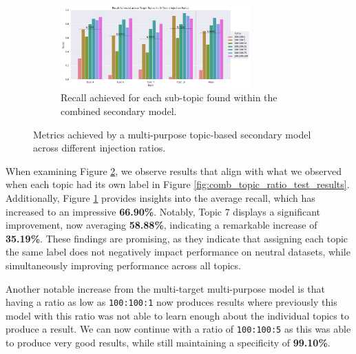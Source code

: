 \begin{figure}[ht]
    \begin{subfigure}[b]{\textwidth}
        \centering
        \includegraphics[width=0.8\textwidth]{graphs/ratio/combined_sl/sp.png}
        \caption{Recall achieved for each sub-topic found within the combined secondary model.}
        \label{subfig:secondary_positive_metrics_comb_sl}
    \end{subfigure}

    \vspace{0.2cm}

    \caption{Metrics achieved by a multi-purpose topic-based secondary model across different injection ratios.}
    \label{fig:comb_sl_topic_ratio_test_results}
\end{figure}

When examining Figure \ref{fig:comb_sl_topic_ratio_test_results}, we observe results that align with what we observed when each topic had its own label in Figure \ref{fig:comb_topic_ratio_test_results}. Additionally, Figure \ref{subfig:secondary_positive_metrics_comb_sl} provides insights into the average recall, which has increased to an impressive \textbf{66.90\%}. Notably, Topic 7 displays a significant improvement, now averaging \textbf{58.88\%}, indicating a remarkable increase of \textbf{35.19\%}. These findings are promising, as they indicate that assigning each topic the same label does not negatively impact performance on neutral datasets, while simultaneously improving performance across all topics.

Another notable increase from the multi-target multi-purpose model is that having a ratio as low as \verb|100:100:1| now produces results where previously this model with this ratio was not able to learn enough about the individual topics to produce a result. We can now continue with a ratio of \verb|100:100:5| as this was able to produce very good results, while still maintaining a specificity of \textbf{99.10\%}.

